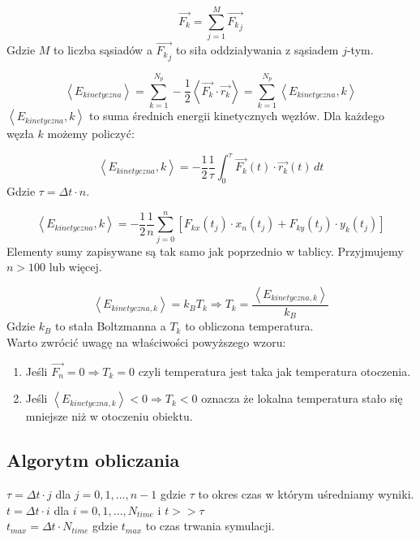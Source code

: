 \documentclass[12pt, letterpaper]{report}
\begin{document}
    \begin{equation}
        \vec{F_k} = \sum_{j = 1}^{M} \vec{{F_k}_j}
    \end{equation}
    Gdzie $M$ to liczba sąsiadów a $\vec{{F_k}_j}$ to siła oddziaływania z sąsiadem $j$-tym.

    \begin{equation}
        \left< E_{kinetyczna} \right> = 
        \sum_{k = 1}^{N_p} -\frac{1}{2} \left< \vec{F_k} \cdot \vec{r_k} \right> =
        \sum_{k = 1}^{N_p} \left< E_{kinetyczna} , k \right>
    \end{equation}
    $\left< E_{kinetyczna} , k \right>$ to suma średnich energii kinetycznych węzłów. Dla każdego węzła $k$ możemy policzyć:

    \begin{equation}
        \left< E_{kinetyczna} , k \right> = 
        -\frac{1}{2} \frac{1}{\tau} \int_{0}^{\tau} \vec{F_k}(t) \cdot \vec{r_k}(t) \, dt
    \end{equation}
    Gdzie $\tau = \Delta t \cdot n$.

    \begin{equation}
        \left< E_{kinetyczna} , k \right> = 
        -\frac{1}{2} \frac{1}{n} \sum_{j = 0}^{n} \left[  F_{kx}(t_j) \cdot x_n(t_j) + F_{ky}(t_j) \cdot y_k(t_j) \right]
    \end{equation}
    Elementy sumy zapisywane są tak samo jak poprzednio w tablicy. Przyjmujemy $n > 100$ lub więcej. 

    \begin{equation}
        \left< E_{kinetyczna, k} \right> = k_B T_k \Rightarrow T_k = \frac{\left< E_{kinetyczna, k} \right>}{k_B}
    \end{equation}
    Gdzie $k_B$ to stała Boltzmanna a $T_k$ to obliczona temperatura. \\

    Warto zwrócić uwagę na właściwości powyższego wzoru:
    \begin{enumerate}
        \item Jeśli $\vec{F_n} = 0 \Rightarrow T_k = 0$ czyli temperatura jest taka jak temperatura otoczenia.
        \item Jeśli $\left< E_{kinetyczna, k} \right> < 0 \Rightarrow T_k < 0$ oznacza że lokalna 
        temperatura stało się mniejsze niż w otoczeniu obiektu.
    \end{enumerate}

    \subsection{Algorytm obliczania}
    $\tau = \Delta t \cdot j$ dla $j = 0, 1, ..., n-1$ gdzie $\tau$ to okres czas w którym uśredniamy wyniki. \\ 
    $t = \Delta t \cdot i$ dla $i = 0, 1, ..., N_{time}$ i $t >> \tau$\\ 
    $t_{max} = \Delta t \cdot N_{time}$ gdzie $t_{max}$ to czas trwania symulacji. \\
    
\end{document}
